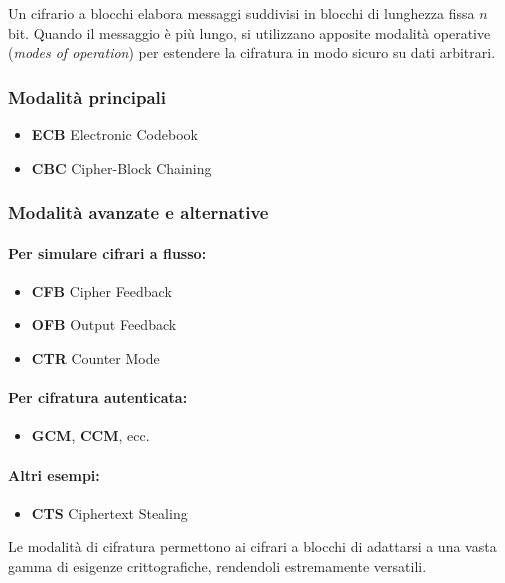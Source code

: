 \documentclass{report}
\begin{document}
Un cifrario a blocchi elabora messaggi suddivisi in blocchi di lunghezza fissa $n$ bit. Quando il messaggio è più lungo, si utilizzano apposite modalità operative (\textit{modes of operation}) per estendere la cifratura in modo sicuro su dati arbitrari.

\subsubsection{Modalità principali}

\begin{itemize}
    \item \textbf{ECB}  Electronic Codebook
    \item \textbf{CBC}  Cipher-Block Chaining
\end{itemize}

\subsubsection{Modalità avanzate e alternative}

\paragraph{Per simulare cifrari a flusso:}
\begin{itemize}
    \item \textbf{CFB}  Cipher Feedback
    \item \textbf{OFB}  Output Feedback
    \item \textbf{CTR}  Counter Mode
\end{itemize}

\paragraph{Per cifratura autenticata:}
\begin{itemize}
    \item \textbf{GCM}, \textbf{CCM}, ecc.
\end{itemize}

\paragraph{Altri esempi:}
\begin{itemize}
    \item \textbf{CTS}  Ciphertext Stealing
\end{itemize}

Le modalità di cifratura permettono ai cifrari a blocchi di adattarsi a una vasta gamma di esigenze crittografiche, rendendoli estremamente versatili.
\end{document}
